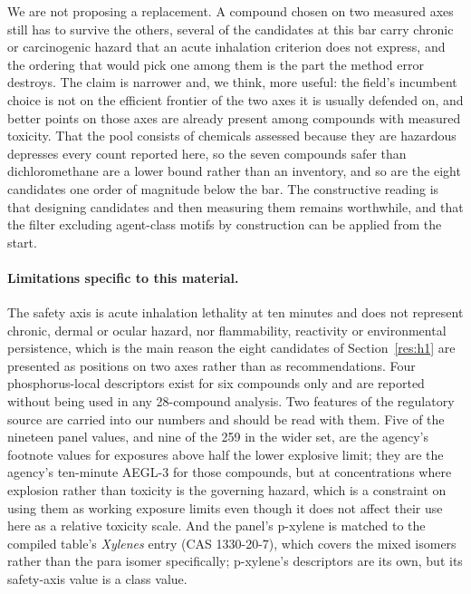 \documentclass[11pt,a4paper]{article}
\begin{document}
We are not proposing a replacement. A compound chosen on two measured axes
still has to survive the others, several of the candidates at this bar carry
chronic or carcinogenic hazard that an acute inhalation criterion does not
express, and the ordering that would pick one among them is the part the
method error destroys. The claim is
narrower and, we think, more useful: the field's incumbent choice is not on the
efficient frontier of the two axes it is usually defended on, and better points
on those axes are already present among compounds with measured toxicity. That
the pool consists of chemicals assessed because they are hazardous depresses
every count reported here, so the seven compounds safer than
dichloromethane are a lower bound rather than an inventory, and so are the eight
candidates one order of magnitude below the bar. The constructive reading is that designing candidates and then
measuring them remains worthwhile, and that the filter excluding agent-class
motifs by construction can be applied from the start.

\paragraph{Limitations specific to this material.} The safety axis is acute inhalation lethality at
ten minutes and does not represent chronic, dermal or ocular hazard, nor
flammability, reactivity or environmental persistence, which is the main reason
the eight candidates of Section~\ref{res:h1} are presented as positions on two
axes rather than as recommendations. Four phosphorus-local descriptors exist for
six compounds only and are reported without being used in any 28-compound
analysis. Two features of the regulatory source are carried into our numbers and
should be read with them. Five of the nineteen panel values, and nine of the 259
in the wider set, are the agency's footnote values for exposures above half the
lower explosive limit; they are the agency's ten-minute AEGL-3 for those
compounds, but at concentrations where explosion rather than toxicity is the
governing hazard, which is a constraint on using them as working exposure
limits even though it does not affect their use here as a relative toxicity
scale. And the panel's p-xylene is matched to the compiled table's
\textit{Xylenes} entry (CAS 1330-20-7), which covers the mixed isomers rather
than the para isomer specifically; p-xylene's descriptors are its own, but its
safety-axis value is a class value.


\end{document}
